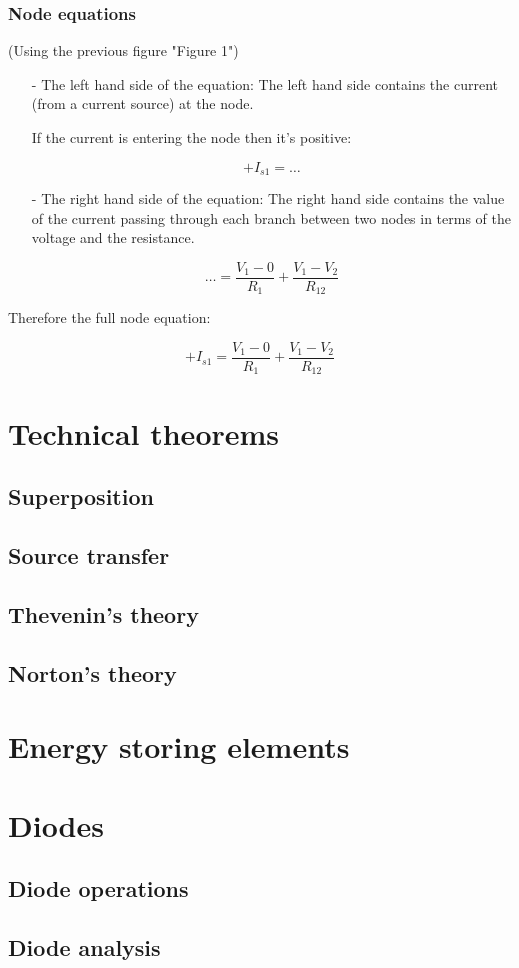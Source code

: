 \documentclass[a4paper]{book}
\begin{document}
\subsubsection{Node equations}

\begin{center} (Using the previous figure "Figure 1") \end{center}

\begin{itemize}

  \item[-] The left hand side of the equation:
    The left hand side contains the current (from a current source) at the node.

    If the current is entering the node then it's positive:

    \[+I_{s1} = \ldots\]

  \item[-] The right hand side of the equation:
    The right hand side contains the value of the current passing
    through each branch between two nodes in terms of the voltage and the resistance.

    \[\ldots = \frac{V_1 - 0}{R_1} + \frac{V_1 - V_2}{R_{12}}\]

\end{itemize}

Therefore the full node equation:

\[+I_{s1} = \frac{V_1 - 0}{R_1} + \frac{V_1 - V_2}{R_{12}}\]

\section{Technical theorems}
  \subsection{Superposition}
  \subsection{Source transfer}
  \subsection{Thevenin's theory}
  \subsection{Norton's theory}
\section{Energy storing elements}
\section{Diodes}
  \subsection{Diode operations}
  \subsection{Diode analysis}
\end{document}
